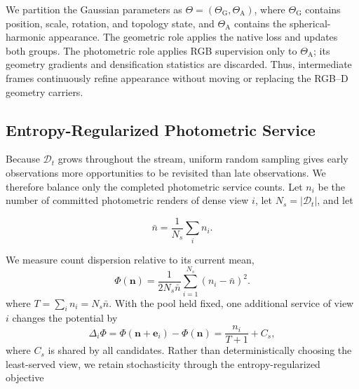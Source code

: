 We partition the Gaussian parameters as
$\Theta=(\Theta_{\mathrm G},\Theta_{\mathrm A})$, where
$\Theta_{\mathrm G}$ contains position, scale, rotation, and topology state,
and $\Theta_{\mathrm A}$ contains the spherical-harmonic appearance.  The
geometric role applies the native loss and updates both groups.  The
photometric role applies RGB supervision only to $\Theta_{\mathrm A}$; its
geometry gradients and densification statistics are discarded.  Thus,
intermediate frames continuously refine appearance without moving or replacing
the RGB--D geometry carriers.


\subsection{Entropy-Regularized Photometric Service}
\label{ssec:ercb}

Because $\mathcal D_t$ grows throughout the stream, uniform random sampling
gives early observations more opportunities to be revisited than late
observations.  We therefore balance only the completed photometric service
counts.  Let $n_i$ be the number of committed photometric renders of dense view
$i$, let $N_s=|\mathcal D_t|$, and let

\begin{equation}
\bar n = \frac{1}{N_s}\sum_i n_i.
\end{equation}

We measure count dispersion relative to its current mean,
\begin{equation}
\Phi(\mathbf n)
=
\frac{1}{2N_s\bar n}
\sum_{i=1}^{N_s}
(n_i-\bar n)^2.
\label{eq:count_dispersion}
\end{equation}
where $T=\sum_i n_i=N_s\bar n$.  With the pool held fixed, one additional
service of view $i$ changes the potential by
\begin{equation}
\Delta_i\Phi
=
\Phi(\mathbf n+\mathbf e_i)-\Phi(\mathbf n)
=
\frac{n_i}{T+1}+C_s,
\label{eq:count_dispersion_increment}
\end{equation}
where $C_s$ is shared by all candidates.  Rather than deterministically
choosing the least-served view, we retain stochasticity through the
entropy-regularized objective

